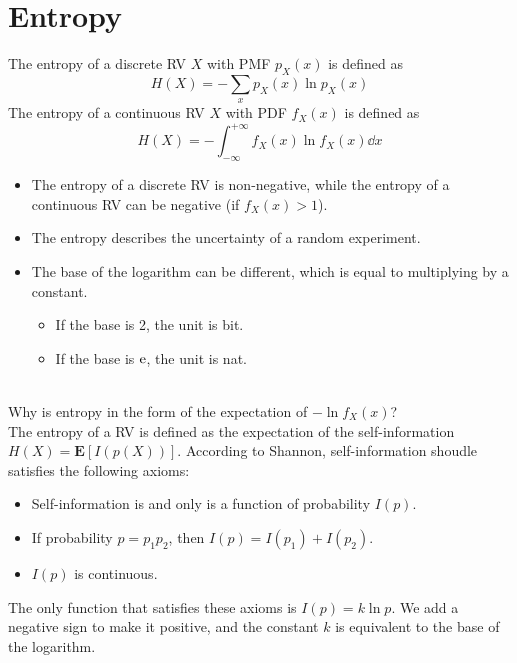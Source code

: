 \section{Entropy}
\begin{definition}[Entropy]
    The entropy of a discrete RV $X$ with PMF $p_X(x)$ is defined as
    \begin{equation}
        H(X) = -\sum_{x} p_X(x) \ln p_X(x)
    \end{equation}
    The entropy of a continuous RV $X$ with PDF $f_X(x)$ is defined as
    \begin{equation}
        H(X) = -\int_{-\infty}^{+\infty} f_X(x) \ln f_X(x) \dd{x}
    \end{equation}
\end{definition}
\begin{remark}
    \begin{itemize}
        \item The entropy of a discrete RV is non-negative, while the entropy of a continuous RV can be negative (if $f_{X}(x) > 1$).
        \item The entropy describes the uncertainty of a random experiment.
        \item The base of the logarithm can be different, which is equal to multiplying by a constant. \begin{itemize}
            \item If the base is 2, the unit is bit.
            \item If the base is $\mathrm{e}$, the unit is nat.
        \end{itemize}
    \end{itemize}
\end{remark}
\begin{remark} \\ 
    Why is entropy in the form of the expectation of $-\ln f_{X}(x)$? \\ 
    The entropy of a RV is defined as the expectation of the self-information $H(X) = \mathbf{E}[I(p(X))]$. According to Shannon, self-information shoudle satisfies the following axioms:
    \begin{itemize}
        \item Self-information is and only is a function of probability $I(p)$.
        \item If probability $p = p_1 p_2$, then $I(p) = I(p_1) + I(p_2)$.
        \item $I(p)$ is continuous.
    \end{itemize}
    The only function that satisfies these axioms is $I(p) = k \ln p$. We add a negative sign to make it positive, and the constant $k$ is equivalent to the base of the logarithm. 
\end{remark}

